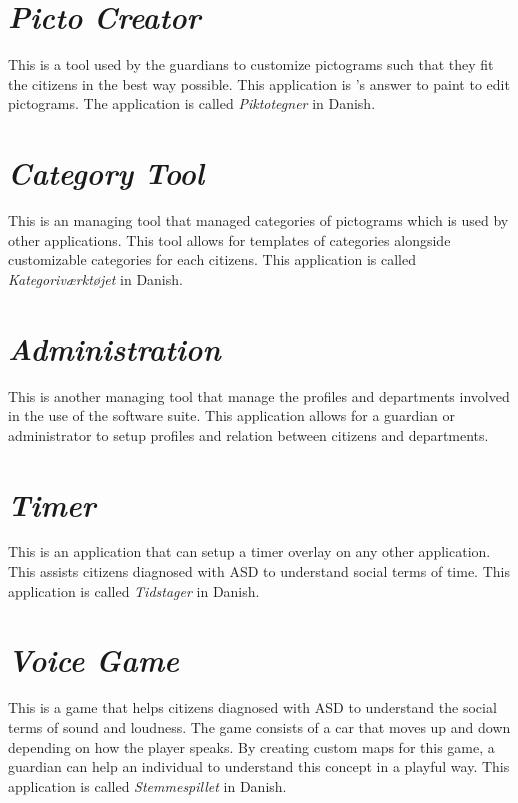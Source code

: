 \section{\emph{Picto Creator}}
\label{sec:app_picto_creator}
This is a tool used by the guardians to customize pictograms such that they fit the citizens in the best way possible. This application is \giraf's answer to paint to edit pictograms. The application is called \emph{Piktotegner} in Danish.

\section{\emph{Category Tool}}
\label{sec:app_category_tool}
This is an managing tool that managed categories of pictograms which is used by other applications. This tool allows for templates of categories alongside customizable categories for each citizens. This application is called \emph{Kategoriværktøjet} in Danish.

\section{\emph{Administration}}
\label{sec:app_administration}
This is another managing tool that manage the profiles and departments involved in the use of the \giraf software suite. This application allows for a guardian or administrator to setup profiles and relation between citizens and departments.

\section{\emph{Timer}}
\label{sec:app_timer}
This is an application that can setup a timer overlay on any other application. This assists citizens diagnosed with ASD to understand social terms of time. This application is called \emph{Tidstager} in Danish.

\section{\emph{Voice Game}}
\label{sec:app_voice_game}
This is a game that helps citizens diagnosed with ASD to understand the social terms of sound and loudness. The game consists of a car that moves up and down depending on how the player speaks. By creating custom maps for this game, a guardian can help an individual to understand this concept in a playful way. This application is called \emph{Stemmespillet} in Danish.

